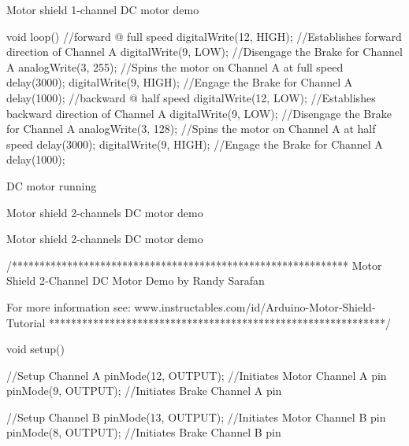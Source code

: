\documentclass[compress]{beamer}
\begin{document}
\begin{frame}[fragile]{Motor shield 1-channel DC motor demo}

\begin{cppcode}
void loop(){
  //forward @ full speed
  digitalWrite(12, HIGH); //Establishes forward direction of Channel A
  digitalWrite(9, LOW); //Disengage the Brake for Channel A
  analogWrite(3, 255); //Spins the motor on Channel A at full speed
  delay(3000);
  digitalWrite(9, HIGH); //Engage the Brake for Channel A
  delay(1000);
  //backward @ half speed
  digitalWrite(12, LOW); //Establishes backward direction of Channel A
  digitalWrite(9, LOW); //Disengage the Brake for Channel A
  analogWrite(3, 128); //Spins the motor on Channel A at half speed
  delay(3000);
  digitalWrite(9, HIGH); //Engage the Brake for Channel A
  delay(1000);
}
\end{cppcode}

\end{frame}


{
    \begin{frame}{DC motor running}
    \end{frame}
}

{
    \begin{frame}{Motor shield 2-channels DC motor demo}
    \end{frame}
}

\begin{frame}[fragile]{Motor shield 2-channels DC motor demo}

\begin{cppcode}
/*************************************************************
Motor Shield 2‐Channel DC Motor Demo
by Randy Sarafan
  
For more information see:
www.instructables.com/id/Arduino-Motor‐Shield‐Tutorial
*************************************************************/
  
  
void  setup()
{
  //Setup Channel A
  pinMode(12, OUTPUT);  //Initiates  Motor  Channel  A  pin
  pinMode(9,  OUTPUT);  //Initiates  Brake  Channel  A  pin
  
  //Setup  Channel  B
  pinMode(13,  OUTPUT);  //Initiates  Motor  Channel  B  pin
  pinMode(8,  OUTPUT);    //Initiates  Brake  Channel  B  pin
}
\end{cppcode}

\end{frame}
\end{document}
